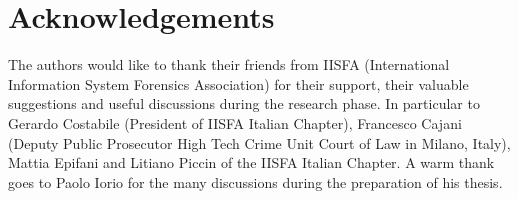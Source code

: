 \documentclass[runningheads]{llncs}
\begin{document}
\section*{Acknowledgements}
The authors would like to thank their friends from IISFA (International Information System Forensics Association) for their support, their valuable suggestions and useful discussions during the research phase. In particular to Gerardo Costabile (President of IISFA Italian Chapter), Francesco Cajani (Deputy Public Prosecutor High Tech Crime Unit Court of Law in Milano, Italy), Mattia Epifani and Litiano Piccin of the IISFA Italian Chapter. A warm thank goes to Paolo Iorio for the many discussions during the preparation of his thesis.
\end{document}
